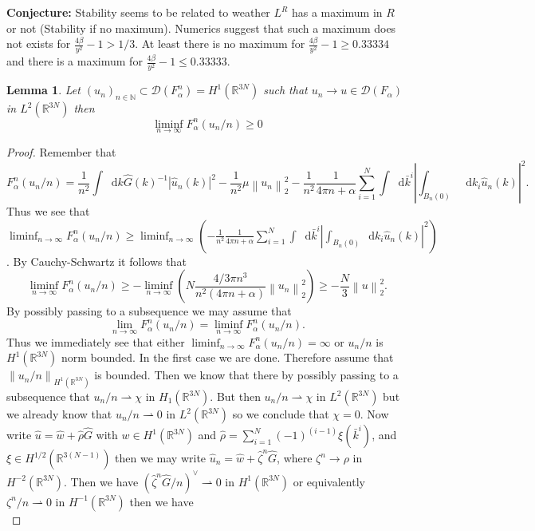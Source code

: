 \documentclass[a4paper,11pt]{article}
\newcommand{\norm}[1]{\left\lVert #1 \right\rVert}
\newcommand{\abs}[1]{\left\lvert #1 \right\rvert}
\newcommand{\dom}[1]{\mathscr D\left(#1\right)}
\newcommand*\diff{\mathop{}\!\mathrm{d}}
\newcommand{\R}{\mathbb{R}}
\newtheorem{lemma}{Lemma}
\numberwithin{equation}{section}
\begin{document}
\textbf{Conjecture:} Stability seems to be related to weather $ L^R $ has a maximum in $ R $ or not (Stability if no maximum). Numerics suggest that such a maximum does not exists for $ \frac{4\beta}{y^2}-1>1/3 $. At least there is no maximum for $ \frac{4\beta}{y^2}-1\geq0.33334 $ and there is a maximum for $ \frac{4\beta}{y^2}-1\leq0.33333 $. 
\vspace{0.5cm}
\\
\begin{lemma}
	Let $ (u_n)_{n\in\mathbb{N}}\subset\dom{F_\alpha^n}=H^1(\R^{3N}) $ such that $ u_n\to u\in\dom{F_\alpha} $ in $ L^2(\R^{3N}) $ then \begin{equation}
	\liminf_{n\to\infty}F_\alpha^n(u_n/n)\geq 0
	\end{equation}
\end{lemma}
\begin{proof}
	Remember that \begin{equation}
	F_\alpha^n(u_n/n)=\frac{1}{n^2}\int\diff k \hat{G}(k)^{-1}\abs{\hat{u}_n(k)}^2-\frac{1}{n^2}\mu\norm{u_n}_2^2-\frac{1}{n^2}\frac{1}{4\pi n+\alpha}\sum_{i=1}^{N}\int\diff\bar{k}^i\left\lvert\int_{B_n(0)}\diff k_i\hat{u}_n(k)\right\rvert^2.
	\end{equation}
	Thus we see that $ \liminf_{n\to\infty}F_\alpha^n(u_n/n)\geq\liminf_{n\to\infty}\left(-\frac{1}{n^2}\frac{1}{4\pi n+\alpha}\sum_{i=1}^{N}\int\diff\bar{k}^i\left\lvert\int_{B_n(0)}\diff k_i\hat{u}_n(k)\right\rvert^2\right) $. By Cauchy-Schwartz it follows that \begin{equation}
	\liminf_{n\to\infty}F_\alpha^n(u_n/n)\geq-\liminf_{n\to\infty}\left(N\frac{4/3\pi n^3}{n^2(4\pi n +\alpha)}\norm{u_n}^2_2\right)\geq-\frac{N}{3}\norm{u}_2^2.
	\end{equation}
	By possibly passing to a subsequence we may assume that \begin{equation}
	\lim_{n\to\infty}F_\alpha^n(u_n/n)=\liminf_{n\to\infty}F_\alpha^n(u_n/n).
	\end{equation}Thus we immediately see that either $ \liminf_{n\to\infty}F_\alpha^n(u_n/n)=\infty $ or $ u_n/n $ is $ H^1(\R^{3N}) $ norm bounded. In the first case we are done. Therefore assume that $ \norm{u_n/n}_{H^1(\R^{3N})} $ is bounded. Then we know that there by possibly passing to a subsequence that $ u_n/n\rightharpoonup\chi $ in $ H_1(\R^{3N}) $. But then $ u_n/n\rightharpoonup\chi $ in $ L^2(\R^{3N}) $ but we already know that $ u_n/n\rightharpoonup0 $ in $ L^2(\R^{3N}) $ so we conclude that $ \chi=0 $. Now write $ \hat{u}=\hat{w}+\hat{\rho}\hat{G} $ with $ w\in H^1(\R^{3N}) $ and $ \hat{\rho}=\sum_{i=1}^{N}(-1)^{(i-1)}\xi(\bar{k}^i) $, and $ \xi\in H^{1/2}(\R^{3(N-1)}) $ then we may write $ \hat{u}_n=\hat{w}+\hat{\zeta}^n\hat{G} $, where $ \zeta^n\to\rho $ in $ H^{-2}(\R^{3N}) $. Then we have $ \left(\hat{\zeta}^n\hat{G}/n\right)^\vee\rightharpoonup0 $ in $ H^1(\R^{3N}) $ or equivalently $ \zeta^n/n\rightharpoonup0 $ in $ H^{-1}(\R^{3N}) $ then we have\begin{equation}

\end{equation}
\end{proof}
\end{document}
